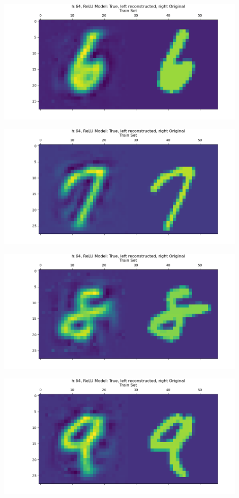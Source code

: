 \documentclass[]{article}
\begin{document}
        \begin{center}
            \includegraphics*[width=12cm]{A4plots/06-53-52-h-64-nonlin-digit-6.png}
        \end{center}
        \begin{center}
            \includegraphics*[width=12cm]{A4plots/06-53-53-h-64-nonlin-digit-7.png}
        \end{center}
        \begin{center}
            \includegraphics*[width=12cm]{A4plots/06-53-53-h-64-nonlin-digit-8.png}
        \end{center}
        \begin{center}
            \includegraphics*[width=12cm]{A4plots/06-53-53-h-64-nonlin-digit-9.png}
        \end{center}
        
\end{document}
